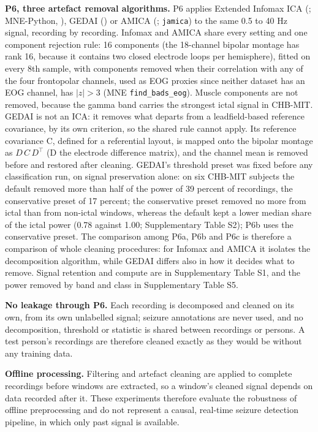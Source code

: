 \documentclass[11pt,a4paper]{article}
\begin{document}
\textbf{P6, three artefact removal algorithms.} P6 applies Extended Infomax ICA (\citealp{Lee_1999}; MNE-Python, \citealp{Gramfort_2013}), GEDAI (\citealp{Ros_2025}) or AMICA (\citealp{Palmer_2008}; \nolinkurl{jamica}) to the same 0.5 to 40 Hz signal, recording by recording.
Infomax and AMICA share every setting and one component rejection rule: 16 components
(the 18-channel bipolar montage has rank 16, because it contains two closed electrode
loops per hemisphere), fitted on every 8th sample, with components removed when their
correlation with any of the four frontopolar channels, used as EOG proxies since
neither dataset has an EOG channel, has \(|z| > 3\) (MNE \nolinkurl{find_bads_eog}). Muscle
components are not removed, because the gamma band carries the strongest ictal signal
in CHB-MIT. GEDAI is not an ICA: it removes what departs from a leadfield-based
reference covariance, by its own criterion, so the shared rule cannot apply. Its
reference covariance C, defined for a referential layout, is mapped onto the bipolar
montage as \(D\,C\,D^{\top}\) (D the electrode difference matrix), and the channel mean is removed
before and restored after cleaning. GEDAI's threshold preset was fixed before any
classification run, on signal preservation alone: on six CHB-MIT subjects the default
removed more than half of the power of 39 percent of recordings, the conservative
preset of 17 percent; the conservative preset removed no more from ictal than from
non-ictal windows, whereas the default kept a lower median share of the ictal power
(0.78 against 1.00; Supplementary Table S2); P6b uses the conservative preset. The comparison among P6a,
P6b and P6c is therefore a comparison of whole cleaning procedures: for Infomax and
AMICA it isolates the decomposition algorithm, while GEDAI differs also in how it
decides what to remove. Signal retention and compute are in Supplementary Table S1, and the power removed by band
and class in Supplementary Table S5.

\textbf{No leakage through P6.} Each recording is decomposed and cleaned on its own, from
its own unlabelled signal; seizure annotations are never used, and no decomposition,
threshold or statistic is shared between recordings or persons. A test person's
recordings are therefore cleaned exactly as they would be without any training data.

\textbf{Offline processing.} Filtering and artefact cleaning are applied to complete
recordings before windows are extracted, so a window's cleaned signal depends on data
recorded after it. These experiments therefore evaluate the robustness of offline
preprocessing and do not represent a causal, real-time seizure detection pipeline, in
which only past signal is available.
\end{document}
